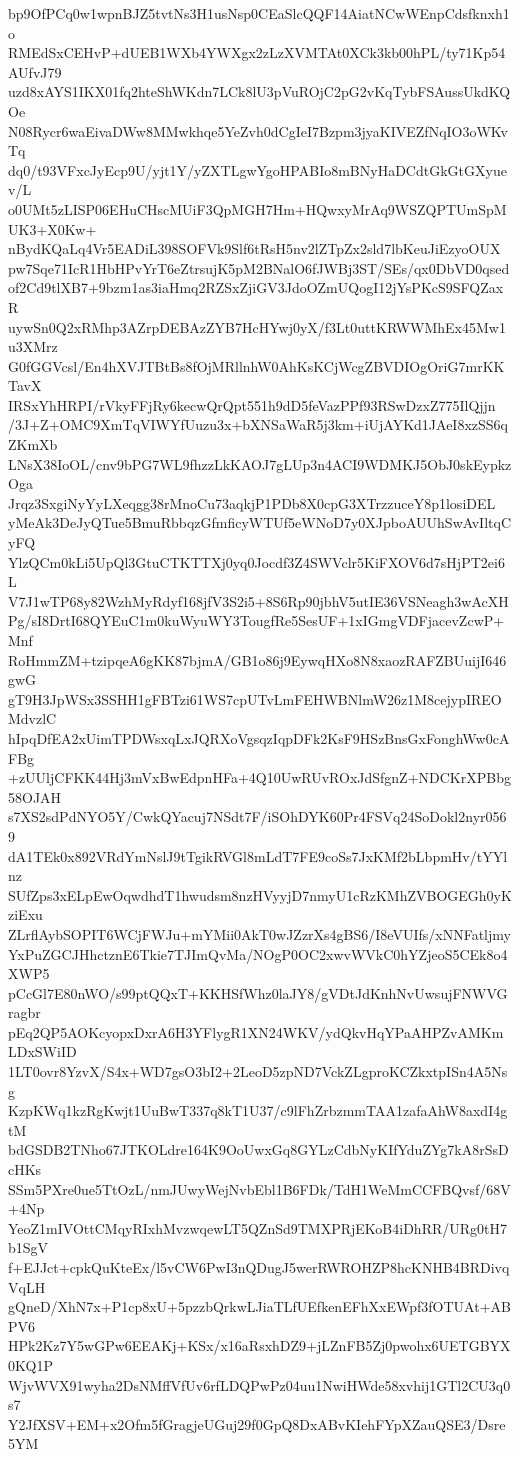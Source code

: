 bp9OfPCq0w1wpnBJZ5tvtNs3H1usNsp0CEaSlcQQF14AiatNCwWEnpCdsfknxh1o
RMEdSxCEHvP+dUEB1WXb4YWXgx2zLzXVMTAt0XCk3kb00hPL/ty71Kp54AUfvJ79
uzd8xAYS1IKX01fq2hteShWKdn7LCk8lU3pVuROjC2pG2vKqTybFSAussUkdKQOe
N08Rycr6waEivaDWw8MMwkhqe5YeZvh0dCgIeI7Bzpm3jyaKIVEZfNqIO3oWKvTq
dq0/t93VFxcJyEcp9U/yjt1Y/yZXTLgwYgoHPABIo8mBNyHaDCdtGkGtGXyuev/L
o0UMt5zLISP06EHuCHscMUiF3QpMGH7Hm+HQwxyMrAq9WSZQPTUmSpMUK3+X0Kw+
nBydKQaLq4Vr5EADiL398SOFVk9Slf6tRsH5nv2lZTpZx2sld7lbKeuJiEzyoOUX
pw7Sqe71IcR1HbHPvYrT6eZtrsujK5pM2BNalO6fJWBj3ST/SEs/qx0DbVD0qsed
of2Cd9tlXB7+9bzm1as3iaHmq2RZSxZjiGV3JdoOZmUQogI12jYsPKcS9SFQZaxR
uywSn0Q2xRMhp3AZrpDEBAzZYB7HcHYwj0yX/f3Lt0uttKRWWMhEx45Mw1u3XMrz
G0fGGVcsl/En4hXVJTBtBs8fOjMRllnhW0AhKsKCjWcgZBVDIOgOriG7mrKKTavX
IRSxYhHRPI/rVkyFFjRy6kecwQrQpt551h9dD5feVazPPf93RSwDzxZ775IlQjjn
/3J+Z+OMC9XmTqVIWYfUuzu3x+bXNSaWaR5j3km+iUjAYKd1JAeI8xzSS6qZKmXb
LNsX38IoOL/cnv9bPG7WL9fhzzLkKAOJ7gLUp3n4ACI9WDMKJ5ObJ0skEypkzOga
Jrqz3SxgiNyYyLXeqgg38rMnoCu73aqkjP1PDb8X0cpG3XTrzzuceY8p1losiDEL
yMeAk3DeJyQTue5BmuRbbqzGfmficyWTUf5eWNoD7y0XJpboAUUhSwAvIltqCyFQ
YlzQCm0kLi5UpQl3GtuCTKTTXj0yq0Jocdf3Z4SWVclr5KiFXOV6d7sHjPT2ei6L
V7J1wTP68y82WzhMyRdyf168jfV3S2i5+8S6Rp90jbhV5utIE36VSNeagh3wAcXH
Pg/sI8DrtI68QYEuC1m0kuWyuWY3TougfRe5SesUF+1xIGmgVDFjacevZcwP+Mnf
RoHmmZM+tzipqeA6gKK87bjmA/GB1o86j9EywqHXo8N8xaozRAFZBUuijI646gwG
gT9H3JpWSx3SSHH1gFBTzi61WS7cpUTvLmFEHWBNlmW26z1M8cejypIREOMdvzlC
hIpqDfEA2xUimTPDWsxqLxJQRXoVgsqzIqpDFk2KsF9HSzBnsGxFonghWw0cAFBg
+zUUljCFKK44Hj3mVxBwEdpnHFa+4Q10UwRUvROxJdSfgnZ+NDCKrXPBbg58OJAH
s7XS2sdPdNYO5Y/CwkQYacuj7NSdt7F/iSOhDYK60Pr4FSVq24SoDokl2nyr0569
dA1TEk0x892VRdYmNslJ9tTgikRVGl8mLdT7FE9coSs7JxKMf2bLbpmHv/tYYlnz
SUfZps3xELpEwOqwdhdT1hwudsm8nzHVyyjD7nmyU1cRzKMhZVBOGEGh0yKziExu
ZLrflAybSOPIT6WCjFWJu+mYMii0AkT0wJZzrXs4gBS6/I8eVUIfs/xNNFatljmy
YxPuZGCJHhctznE6Tkie7TJImQvMa/NOgP0OC2xwvWVkC0hYZjeoS5CEk8o4XWP5
pCcGl7E80nWO/s99ptQQxT+KKHSfWhz0laJY8/gVDtJdKnhNvUwsujFNWVGragbr
pEq2QP5AOKcyopxDxrA6H3YFlygR1XN24WKV/ydQkvHqYPaAHPZvAMKmLDxSWiID
1LT0ovr8YzvX/S4x+WD7gsO3bI2+2LeoD5zpND7VckZLgproKCZkxtpISn4A5Nsg
KzpKWq1kzRgKwjt1UuBwT337q8kT1U37/c9lFhZrbzmmTAA1zafaAhW8axdI4gtM
bdGSDB2TNho67JTKOLdre164K9OoUwxGq8GYLzCdbNyKIfYduZYg7kA8rSsDcHKs
SSm5PXre0ue5TtOzL/nmJUwyWejNvbEbl1B6FDk/TdH1WeMmCCFBQvsf/68V+4Np
YeoZ1mIVOttCMqyRIxhMvzwqewLT5QZnSd9TMXPRjEKoB4iDhRR/URg0tH7b1SgV
f+EJJct+cpkQuKteEx/l5vCW6PwI3nQDugJ5werRWROHZP8hcKNHB4BRDivqVqLH
gQneD/XhN7x+P1cp8xU+5pzzbQrkwLJiaTLfUEfkenEFhXxEWpf3fOTUAt+ABPV6
HPk2Kz7Y5wGPw6EEAKj+KSx/x16aRsxhDZ9+jLZnFB5Zj0pwohx6UETGBYX0KQ1P
WjvWVX91wyha2DsNMffVfUv6rfLDQPwPz04uu1NwiHWde58xvhij1GTl2CU3q0s7
Y2JfXSV+EM+x2Ofm5fGragjeUGuj29f0GpQ8DxABvKIehFYpXZauQSE3/Dsre5YM
